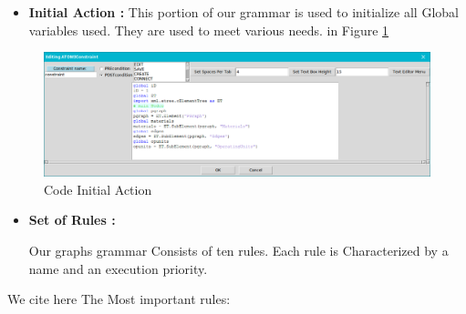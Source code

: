 \begin{itemize}
\item \textbf{Initial Action : } This portion of our grammar is used to initialize all
Global variables used. They are used to meet various needs. in Figure \ref{fig:Code Initial Action} 

\end{itemize}

\begin{figure}[th]
	\centering %
 	\includegraphics[scale=0.38]{ch3/img/InitAct}
	\caption{\label{fig:Code Initial Action}Code Initial Action}
\end{figure} 


\pagebreak
\begin{itemize}
\item \textbf{ Set of Rules : } 
 
Our graphs grammar Consists of ten rules. Each
rule is Characterized by a name and an execution priority. 

\end{itemize}
We cite here The Most important rules: 
